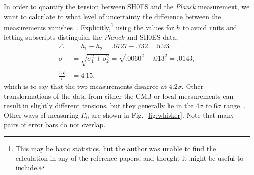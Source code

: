 \documentclass[12pt]{article}
\newcommand{\Planck}[1]{\textit{Planck}}
\newcommand{\nn}{\nonumber\\}
\begin{document}
In order to quantify the tension between SH0ES and the \Planck{} measurement, we want to calculate to what level of uncertainty the difference between the measurements vanishes~\cite{Dietrich2014}. Explicitly,\footnote{This may be basic statistics, but the author was unable to find the calculation in any of the reference papers, and thought it might be useful to include.} using the values for $h$ to avoid units and letting subscripts distinguish the \Planck{} and SH0ES data, 
\begin{align}
\Delta &= h_1 - h_2 = .6727 - .732 = 5.93,\nn
\sigma &= \sqrt{\sigma_1^2 + \sigma_2^2} = \sqrt{.0060^2 + .013^2} = .0143,\nn
\frac{|\Delta|}{\sigma} &= 4.15,
\end{align}
which is to say that the two measurements disagree at $4.2\sigma$. Other transformations of the data from either the CMB or local measurements can result in slightly different tensions, but they generally lie in the $4\sigma$ to $6\sigma$ range~\cite{DiValentino2021}. Other ways of measuring $H_0$ are shown in 
Fig.~\ref{fig:whisker}. Note that many pairs of error bars do not overlap.
\end{document}
